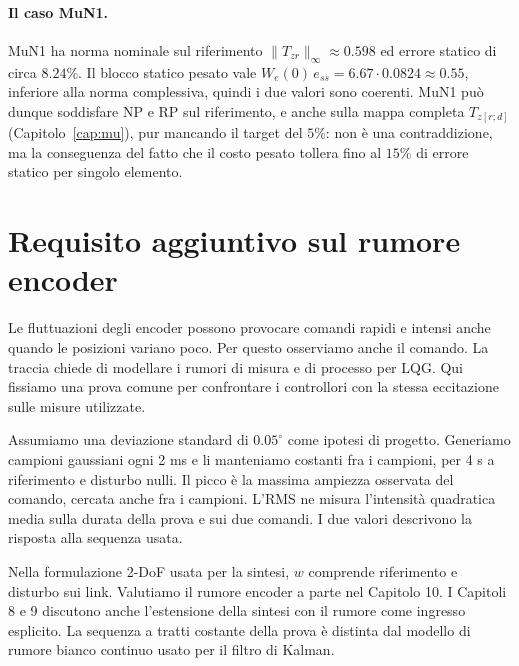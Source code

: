 \paragraph{Il caso MuN1.} MuN1 ha norma nominale sul riferimento
$\|T_{zr}\|_\infty\approx0.598$ ed errore statico di circa $8.24\%$.
Il blocco statico pesato vale $W_e(0)\,e_{ss}=6.67\cdot0.0824\approx0.55$,
inferiore alla norma complessiva, quindi i due valori sono coerenti.
MuN1 può dunque soddisfare NP e RP sul riferimento, e anche sulla mappa
completa $T_{z[r;d]}$ (Capitolo~\ref{cap:mu}), pur mancando il
target del $5\%$: non è una contraddizione, ma la conseguenza del fatto
che il costo pesato tollera fino al $15\%$ di errore statico per
singolo elemento.

\section{Requisito aggiuntivo sul rumore encoder}
Le fluttuazioni degli encoder possono provocare comandi rapidi e
intensi anche quando le posizioni variano poco. Per questo osserviamo
anche il comando. La traccia chiede di modellare i rumori di misura
e di processo per LQG. Qui fissiamo una prova comune per confrontare
i controllori con la stessa eccitazione sulle misure utilizzate.

Assumiamo una deviazione standard di $0.05^\circ$ come ipotesi di
progetto. Generiamo campioni gaussiani ogni 2 ms e li manteniamo
costanti fra i campioni, per 4 s a riferimento e disturbo nulli.
Il picco è la massima ampiezza osservata del comando, cercata anche
fra i campioni. L'RMS ne misura l'intensità quadratica media sulla
durata della prova e sui due comandi. I due valori descrivono la
risposta alla sequenza usata.

Nella formulazione 2-DoF usata per la sintesi, $w$ comprende riferimento
e disturbo sui link. Valutiamo il rumore encoder a parte nel
Capitolo 10. I Capitoli 8 e 9 discutono anche l'estensione della
sintesi con il rumore come ingresso esplicito. La sequenza a tratti
costante della prova è distinta dal modello di rumore bianco
continuo usato per il filtro di Kalman.
